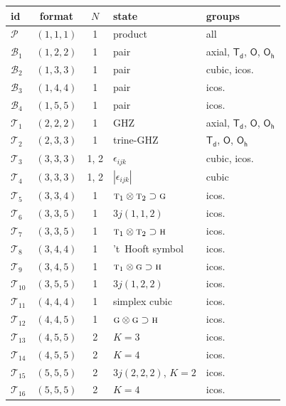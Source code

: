 \documentclass[
  reprint,
  aps,
  prx,
  superscriptaddress,
  amsmath,
  amssymb,
  longbibliography
]{revtex4-2}
\newcommand{\grp}[1]{\mathsf{#1}}
\newcommand{\irr}[1]{\text{\normalfont\scshape #1}}
\newcommand{\irrprod}{\otimes}
\newcommand{\catP}{\mathcal{P}}
\newcommand{\catB}[1]{\mathcal{B}_{#1}}
\newcommand{\catT}[1]{\mathcal{T}_{#1}}
\begin{document}
\begin{table}[t]
\centering
\footnotesize
\setlength{\tabcolsep}{4pt}
\begin{tabular}{lccll}
\toprule
id & format & $N$ & state & groups\\
\midrule
$\catP$ & $(1,1,1)$ & 1 & product & all\\
\midrule
$\catB{1}$ & $(1,2,2)$ & 1 & pair & axial, $\grp{T_{d}}$, $\grp{O}$, $\grp{O_{h}}$\\
$\catB{2}$ & $(1,3,3)$ & 1 & pair & cubic, icos.\\
$\catB{3}$ & $(1,4,4)$ & 1 & pair & icos.\\
$\catB{4}$ & $(1,5,5)$ & 1 & pair & icos.\\
\midrule
$\catT{1}$ & $(2,2,2)$ & 1 & GHZ & axial, $\grp{T_{d}}$, $\grp{O}$, $\grp{O_{h}}$\\
$\catT{2}$ & $(2,3,3)$ & 1 & trine-GHZ & $\grp{T_{d}}$, $\grp{O}$, $\grp{O_{h}}$\\
$\catT{3}$ & $(3,3,3)$ & 1, 2 & $\epsilon_{ijk}$ & cubic, icos.\\
$\catT{4}$ & $(3,3,3)$ & 1, 2 & $|\epsilon_{ijk}|$ & cubic\\
$\catT{5}$ & $(3,3,4)$ & 1 & $\irr{t}_{1}\irrprod\irr{t}_{2}\supset\irr{g}$ & icos.\\
$\catT{6}$ & $(3,3,5)$ & 1 & $3j(1,1,2)$ & icos.\\
$\catT{7}$ & $(3,3,5)$ & 1 & $\irr{t}_{1}\irrprod\irr{t}_{2}\supset\irr{h}$ & icos.\\
$\catT{8}$ & $(3,4,4)$ & 1 & 't~Hooft symbol & icos.\\
$\catT{9}$ & $(3,4,5)$ & 1 & $\irr{t}_{1}\irrprod\irr{g}\supset\irr{h}$ & icos.\\
$\catT{10}$ & $(3,5,5)$ & 1 & $3j(1,2,2)$ & icos.\\
$\catT{11}$ & $(4,4,4)$ & 1 & simplex cubic & icos.\\
$\catT{12}$ & $(4,4,5)$ & 1 & $\irr{g}\irrprod\irr{g}\supset\irr{h}$ & icos.\\
$\catT{13}$ & $(4,5,5)$ & 2 & $K=3$ & icos.\\
$\catT{14}$ & $(4,5,5)$ & 2 & $K=4$ & icos.\\
$\catT{15}$ & $(5,5,5)$ & 2 & $3j(2,2,2)$, $K=2$ & icos.\\
$\catT{16}$ & $(5,5,5)$ & 2 & $K=4$ & icos.\\
\bottomrule
\end{tabular}


\end{table}
\end{document}

